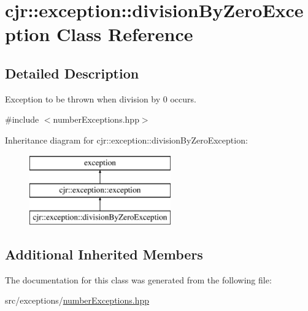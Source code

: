\hypertarget{classcjr_1_1exception_1_1division_by_zero_exception}{\section{cjr\-:\-:exception\-:\-:division\-By\-Zero\-Exception Class Reference}
\label{classcjr_1_1exception_1_1division_by_zero_exception}
}


\subsection{Detailed Description}
Exception to be thrown when division by 0 occurs. 

{\ttfamily \#include $<$number\-Exceptions.\-hpp$>$}

Inheritance diagram for cjr\-:\-:exception\-:\-:division\-By\-Zero\-Exception\-:\begin{figure}[H]
\begin{center}
\leavevmode
\includegraphics[height=3.000000cm]{classcjr_1_1exception_1_1division_by_zero_exception}
\end{center}
\end{figure}
\subsection*{Additional Inherited Members}


The documentation for this class was generated from the following file\-:\begin{DoxyCompactItemize}
\item 
src/exceptions/\hyperlink{number_exceptions_8hpp}{number\-Exceptions.\-hpp}\end{DoxyCompactItemize}
